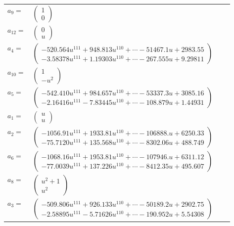 \documentclass[1p]{elsarticle_modified}
\theoremstyle{definition}
\begin{document}
\begin{tabular}{m{7pt} m{180pt} m{7pt} m{180pt} }
\flushright $a_{9}=$&$\begin{pmatrix}1\\0\end{pmatrix}$ \\
\flushright $a_{12}=$&$\begin{pmatrix}0\\u\end{pmatrix}$ \\
\flushright $a_{4}=$&$\begin{pmatrix}-520.564 u^{111}+948.813 u^{110}+\cdots-51467.1 u+2983.55\\-3.58378 u^{111}+1.19303 u^{110}+\cdots-267.555 u+9.29811\end{pmatrix}$ \\
\flushright $a_{10}=$&$\begin{pmatrix}1\\- u^2\end{pmatrix}$ \\
\flushright $a_{5}=$&$\begin{pmatrix}-542.410 u^{111}+984.657 u^{110}+\cdots-53337.3 u+3085.16\\-2.16416 u^{111}-7.83445 u^{110}+\cdots-108.879 u+1.44931\end{pmatrix}$ \\
\flushright $a_{1}=$&$\begin{pmatrix}u\\u\end{pmatrix}$ \\
\flushright $a_{2}=$&$\begin{pmatrix}-1056.91 u^{111}+1933.81 u^{110}+\cdots-106888. u+6250.33\\-75.7120 u^{111}+135.568 u^{110}+\cdots-8302.06 u+488.749\end{pmatrix}$ \\
\flushright $a_{6}=$&$\begin{pmatrix}-1068.16 u^{111}+1953.81 u^{110}+\cdots-107946. u+6311.12\\-77.0039 u^{111}+137.226 u^{110}+\cdots-8412.35 u+495.607\end{pmatrix}$ \\
\flushright $a_{8}=$&$\begin{pmatrix}u^2+1\\u^2\end{pmatrix}$ \\
\flushright $a_{3}=$&$\begin{pmatrix}-509.806 u^{111}+926.133 u^{110}+\cdots-50189.2 u+2902.75\\-2.58895 u^{111}-5.71626 u^{110}+\cdots-190.952 u+5.54308\end{pmatrix}$ \\

\end{tabular}
\end{document}
